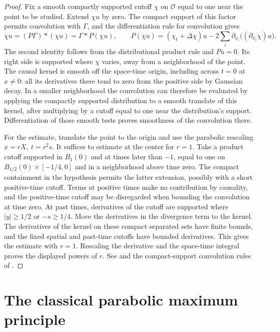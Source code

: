 \documentclass[11pt,oneside,openany]{book}
\theoremstyle{plain}
\theoremstyle{definition}
\theoremstyle{remark}
\begin{document}
\begin{proof}
Fix a smooth compactly supported cutoff \(\chi\) on \(\mathcal O\)
equal to one near the point to be studied. Extend \(\chi u\) by zero.
The compact support of this factor permits convolution with
\(\Gamma\), and the differentiation rule for convolution gives
\[
 \chi u=(P\Gamma)*(\chi u)=\Gamma*P(\chi u),\qquad
 P(\chi u)=(\chi_t+\Delta\chi)u
                    -2\sum_i\partial_{x_i}\bigl((\partial_{x_i}\chi)u\bigr).
\]
The second identity follows from the distributional product rule
and \(Pu=0\). Its right side is supported where \(\chi\) varies,
away from a neighborhood of the point. The causal kernel is smooth
off the space-time origin, including across \(t=0\) at \(x\ne0\):
all its derivatives there tend to zero from the positive side by
Gaussian decay. In a smaller neighborhood the convolution can
therefore be evaluated by applying the compactly supported
distribution to a smooth translate of this kernel, after multiplying
by a cutoff equal to one near the distribution's support.
Differentiation of those smooth tests proves smoothness of the
convolution there.

For the estimate, translate the point to the origin and use the
parabolic rescaling \(x=rX,\ t=r^2s\). It suffices to estimate at
the center for \(r=1\). Take a product cutoff supported in
\(B_1(0)\) and at times later than \(-1\), equal to one on
\(B_{1/2}(0)\times[-1/4,0]\) and in a neighborhood above time zero.
The compact containment in the hypothesis permits the latter
extension, possibly with a short positive-time cutoff. Terms at
positive times make no contribution by causality, and the
positive-time cutoff may be disregarded when bounding the
convolution at time zero. At past times, derivatives of the cutoff
are supported where \(|y|\geq1/2\) or \(-s\geq1/4\). Move the
derivatives in the divergence term to the kernel. The derivatives
of the kernel on these compact separated sets have finite bounds,
and the fixed spatial and past-time cutoffs have bounded derivatives.
This gives the estimate with \(r=1\). Rescaling the derivative and
the space-time integral proves the displayed powers of \(r\).
See \cite[\S 2.3.3]{Evans} and the compact-support convolution rules
of \cite[Unit U4]{P102}.
\end{proof}


\section{The classical parabolic maximum principle}
\label{pde:H03}
\end{document}
